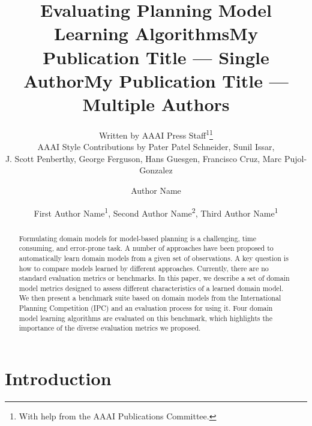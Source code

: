 \documentclass[letterpaper]{article} %
\title{Evaluating Planning Model Learning Algorithms}
\author{
    Written by AAAI Press Staff\textsuperscript{\rm 1}\thanks{With help from the AAAI Publications Committee.}\\
    AAAI Style Contributions by Pater Patel Schneider,
    Sunil Issar,\\
    J. Scott Penberthy,
    George Ferguson,
    Hans Guesgen,
    Francisco Cruz\equalcontrib,
    Marc Pujol-Gonzalez\equalcontrib
}
\title{My Publication Title --- Single Author}
\author {
    Author Name
}
\title{My Publication Title --- Multiple Authors}
\author {
    First Author Name\textsuperscript{\rm 1},
    Second Author Name\textsuperscript{\rm 2},
    Third Author Name\textsuperscript{\rm 1}
}
\newif\ifaddcomments
\newcommand{\roni}[1]{\ifaddcomments{\textcolor{red}{[Roni: #1]}}\fi}
\begin{document}
\maketitle

\begin{abstract}
Formulating domain models for model-based planning is a challenging, time consuming, and error-prone task. A number of approaches have been proposed to automatically learn domain models from a given set of observations. A key question is how to compare models learned by different approaches. 
Currently, there are no standard evaluation metrics or benchmarks. 
In this paper, we describe a set of domain model metrics designed to assess different characteristics of a learned domain model. We then present a benchmark suite based on domain models from the International Planning Competition (IPC) and an evaluation process for using it.
Four domain model learning algorithms are evaluated on this benchmark, which highlights the importance of the diverse evaluation metrics we proposed. 
\end{abstract}



\roni{AAAI Instructions: Submissions may consist of up to 7 pages of technical content plus additional pages solely for references and the reproducibility checklist; acknowledgements should be omitted from papers submitted for review.}


\section{Introduction}
\end{document}
